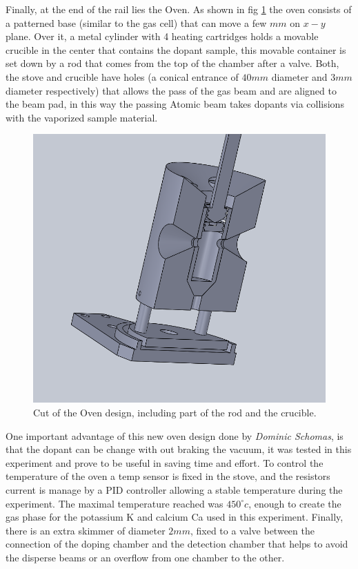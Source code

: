 Finally, at the end of the rail lies the Oven. As shown in fig \ref{img:oven} the oven consists of a patterned base (similar to the gas cell) that can  move a few $mm$ on $x-y$ plane. Over it, a metal cylinder with 4 heating cartridges holds a movable crucible in the center that contains the dopant sample, this movable container is set down by a rod that comes from the top of the chamber after a valve. Both, the stove and crucible have holes (a conical entrance of $40mm$ diameter and $3mm$ diameter respectively) that allows the pass of the gas beam and are aligned to the beam pad, in this way  the passing Atomic beam takes dopants via collisions with the vaporized sample material.

\begin{figure}[hbtp] \label{img:oven}

\centering
\includegraphics[Scale=0.3]{../Images/oven_complete_cut_1.PNG}
\caption{Cut of the Oven design, including part of the rod and the crucible.}
\end{figure}

One important advantage of this new oven design done by \textit{Dominic Schomas},  is that the dopant can be change with out braking the vacuum, it was tested in this experiment and prove to be useful in saving time and effort. To control the temperature of the oven a temp sensor is fixed in the stove, and the resistors current is manage by a PID controller allowing a stable temperature during the experiment. The maximal temperature reached was $450^{\circ}c$,  enough to create the gas phase for the potassium K and calcium Ca used in this experiment. Finally, there is an  extra skimmer of diameter $2mm$, fixed to a valve between the connection of the doping chamber and the detection chamber that helps to avoid the disperse beams or an overflow from one chamber to the other.

